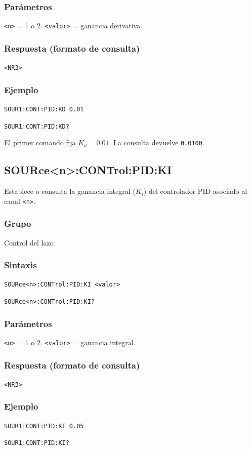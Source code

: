 \subsubsection*{Parámetros}
\texttt{<n>} = 1 o 2. \texttt{<valor>} = ganancia derivativa.

\subsubsection*{Respuesta (formato de consulta)}
\texttt{<NR3>}

\subsubsection*{Ejemplo}
\texttt{SOUR1:CONT:PID:KD 0.01}\par
\texttt{SOUR1:CONT:PID:KD?}

El primer comando fija $K_d = 0.01$. La consulta devuelve \texttt{0.0100}.

\subsection*{SOURce<n>:CONTrol:PID:KI}

Establece o consulta la ganancia integral ($K_i$) del controlador PID
asociado al canal \texttt{<n>}.

\subsubsection*{Grupo}
Control del lazo

\subsubsection*{Sintaxis}
\texttt{SOURce<n>:CONTrol:PID:KI <valor>}\par
\texttt{SOURce<n>:CONTrol:PID:KI?}

\subsubsection*{Parámetros}
\texttt{<n>} = 1 o 2. \texttt{<valor>} = ganancia integral.

\subsubsection*{Respuesta (formato de consulta)}
\texttt{<NR3>}

\subsubsection*{Ejemplo}
\texttt{SOUR1:CONT:PID:KI 0.05}\par
\texttt{SOUR1:CONT:PID:KI?}

